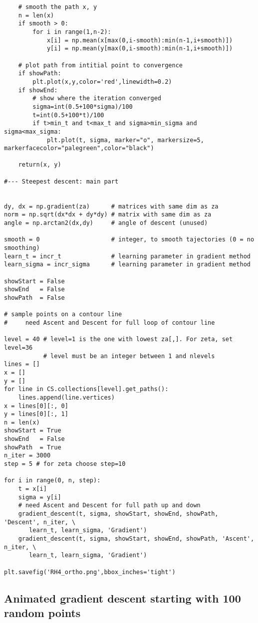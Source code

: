 \documentclass[oneside,10pt]{book}
\begin{document}
\begin{lstlisting}
    # smooth the path x, y
    n = len(x)
    if smooth > 0:
        for i in range(1,n-2):
            x[i] = np.mean(x[max(0,i-smooth):min(n-1,i+smooth)])
            y[i] = np.mean(y[max(0,i-smooth):min(n-1,i+smooth)])

    # plot path from intitial point to convergence
    if showPath:
        plt.plot(x,y,color='red',linewidth=0.2)
    if showEnd:
        # show where the iteration converged
        sigma=int(0.5+100*sigma)/100
        t=int(0.5+100*t)/100
        if t>min_t and t<max_t and sigma>min_sigma and sigma<max_sigma:
            plt.plot(t, sigma, marker="o", markersize=5, markerfacecolor="palegreen",color="black")

    return(x, y)

#--- Steepest descent: main part


dy, dx = np.gradient(za)      # matrices with same dim as za
norm = np.sqrt(dx*dx + dy*dy) # matrix with same dim as za
angle = np.arctan2(dx,dy)     # angle of descent (unused)

smooth = 0                    # integer, to smooth tajectories (0 = no smoothing)
learn_t = incr_t              # learning parameter in gradient method
learn_sigma = incr_sigma      # learning parameter in gradient method

showStart = False
showEnd   = False
showPath  = False

# sample points on a contour line
#     need Ascent and Descent for full loop of contour line

level = 40 # level=1 is the one with lowest za[,]. For zeta, set level=36
           # level must be an integer between 1 and nlevels
lines = []
x = []
y = []
for line in CS.collections[level].get_paths():
    lines.append(line.vertices)
x = lines[0][:, 0]
y = lines[0][:, 1]
n = len(x)
showStart = True
showEnd   = False
showPath  = True
n_iter = 3000
step = 5 # for zeta choose step=10

for i in range(0, n, step):
    t = x[i]
    sigma = y[i]
    # need Ascent and Descent for full path up and down
    gradient_descent(t, sigma, showStart, showEnd, showPath, 'Descent', n_iter, \
       learn_t, learn_sigma, 'Gradient')
    gradient_descent(t, sigma, showStart, showEnd, showPath, 'Ascent', n_iter, \
       learn_t, learn_sigma, 'Gradient')

plt.savefig('RH4_ortho.png',bbox_inches='tight')
\end{lstlisting}

\subsection{Animated gradient descent starting with 100 random points}\label{p100}
\end{document}
